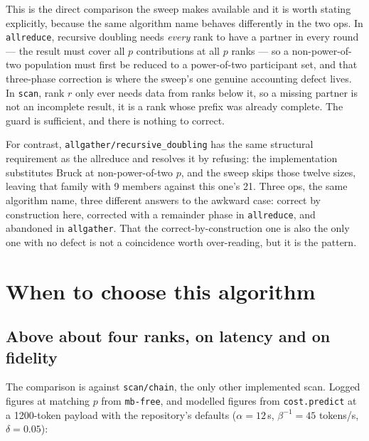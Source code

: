 \documentclass[11pt]{article}
\begin{document}
This is the direct comparison the sweep makes available and it is worth stating explicitly,
because the same algorithm name behaves differently in the two ops. In \texttt{allreduce},
recursive doubling needs \emph{every} rank to have a partner in every round --- the result must
cover all $p$ contributions at all $p$ ranks --- so a non-power-of-two population must first be
reduced to a power-of-two participant set, and that three-phase correction is where the sweep's one
genuine accounting defect lives. In \texttt{scan}, rank $r$ only ever needs data from ranks below
it, so a missing partner is not an incomplete result, it is a rank whose prefix was already
complete. The guard is sufficient, and there is nothing to correct.

For contrast, \texttt{allgather/recursive\_doubling} has the same structural requirement as the
allreduce and resolves it by refusing: the implementation substitutes Bruck at non-power-of-two
$p$, and the sweep skips those twelve sizes, leaving that family with 9 members against this one's
21. Three ops, the same algorithm name, three different answers to the awkward case: correct
by construction here, corrected with a remainder phase in \texttt{allreduce}, and abandoned in
\texttt{allgather}. That the correct-by-construction one is also the only one with no defect is not
a coincidence worth over-reading, but it is the pattern.

\section{When to choose this algorithm}

\subsection{Above about four ranks, on latency and on fidelity}

The comparison is against \texttt{scan/chain}, the only other implemented scan. Logged figures at
matching $p$ from \texttt{mb-free}, and modelled figures from \texttt{cost.predict} at a 1200-token
payload with the repository's defaults ($\alpha = 12$\,s, $\beta^{-1} = 45$ tokens/s,
$\delta = 0.05$):
\end{document}
